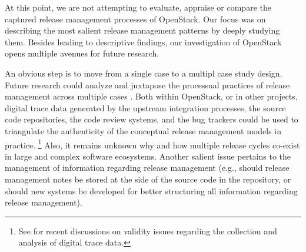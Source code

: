 \documentclass[dvipsnames]{bmcart}
\theoremstyle{definition}
\begin{document}
                                                                                                                                         
 







At this point, we are not attempting to evaluate, appraise or compare the captured release management processes of OpenStack. Our focus was on describing the most salient release management patterns by deeply studying them. Besides leading to descriptive findings, our investigation of OpenStack opens multiple avenues for future research. 

An obvious step is to move from a single case to a multipl case study design. Future research could analyze and juxtapose the processual practices of release management across multiple cases \cite{michlmayr2015and,poo2016release}. Both within OpenStack, or in other projects, digital trace data generated by the upstream integration processes, the source code repositories, the code review systems, and the bug trackers could be used to triangulate the authenticity of the conceptual release management models in practice. \footnote{See \cite{howison2012validity,hedman2013digital,freelon2014interpretation,ruths2014social,Crowston2017} 
for recent discussions on validity issues regarding the collection and analysis of digital trace data.} 
Also, it remains unknown why and how multiple release cycles co-exist in large and complex software ecosystems. Another salient issue pertains to the management of information regarding release management (e.g., should release management notes be stored at the side of the source code in the repository, or should new systems be developed for better structuring all information regarding release management).
\end{document}
